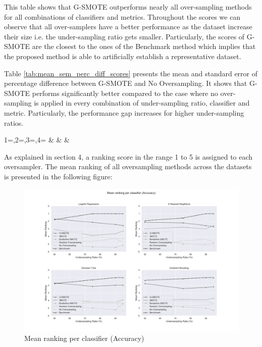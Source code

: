 \documentclass[parskip=full]{scrartcl}
\begin{document}
This table shows that G-SMOTE outperforms nearly all over-sampling methods for
all combinations of classifiers and metrics. Throughout the scores we can
observe that all over-samplers have a better performance as the dataset increase
their size i.e. the under-sampling ratio gets smaller.  Particularly, the scores
of G-SMOTE are the closest to the ones of the Benchmark method which implies
that the proposed method is able to artificially establish a representative
dataset.

Table \ref{tab:mean_sem_perc_diff_scores} presents the mean and standard error
of percentage difference between G-SMOTE and No Oversampling. It shows that
G-SMOTE performs significantly better compared to the case where no
over-sampling is applied in every combination of under-sampling ratio,
classifier and metric. Particularly, the performance gap increases for higher
under-sampling ratios.

\begin{center}
	\begin{footnotesize}
		{1=\ratio,2=\classifier,3=\metric,4=\difference}
		{\ratio & \classifier & \metric & \difference}
	\end{footnotesize}
	\addtocounter{table}{-1}
	\label{tab:mean_sem_perc_diff_scores}
\end{center}

As explained in section 4, a ranking score in the range 1 to 5 is assigned to
each oversampler. The mean ranking of all oversampling methods across the
datasets is presented in the following figure: 

\begin{figure}[H]
	\includegraphics[width=1\linewidth]
		{../analysis/mean_ranking_per_classifier_accuracy}
	\caption{Mean ranking per classifier (Accuracy)}
	\label{fig:mean_ranking_per_classifier_accuracy}
\end{figure}
\end{document}
